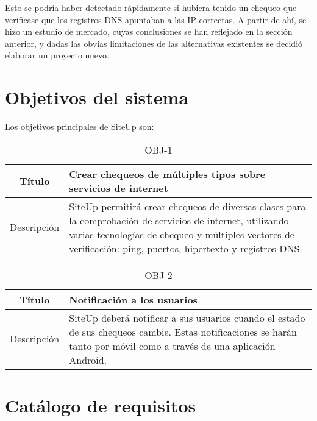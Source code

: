 Esto se podría haber detectado rápidamente si hubiera tenido un chequeo que
verificase que los registros DNS apuntaban a las IP correctas. A partir de ahí,
se hizo un estudio de mercado, cuyas conclusiones se han reflejado en la sección
anterior, y dadas las obvias limitaciones de las alternativas existentes se
decidió elaborar un proyecto nuevo.

\section{Objetivos del sistema}

Los objetivos principales de SiteUp son:

\begin{table}[h!]
  \centering
  \begin{tabularx}{\textwidth}{|c|X|}
    \hline
    Título & Crear chequeos de múltiples tipos sobre servicios de internet \\

    \hline

    Descripción & SiteUp permitirá crear chequeos de diversas clases para la comprobación
    de servicios de internet, utilizando varias tecnologías de chequeo y múltiples vectores de verificación: ping, puertos, hipertexto y registros DNS. \\    

    \hline
  \end{tabularx}
  \caption{OBJ-1}
\end{table}


\begin{table}[h!]
  \centering
  \begin{tabularx}{\textwidth}{|c|X|}
    \hline
    Título & Notificación a los usuarios \\

    \hline

    Descripción & SiteUp deberá notificar a sus usuarios cuando el estado de sus chequeos cambie. Estas notificaciones se harán tanto por móvil como a través de una aplicación Android. \\

    \hline
  \end{tabularx}
  \caption{OBJ-2}
\end{table}

\section{Catálogo de requisitos}

